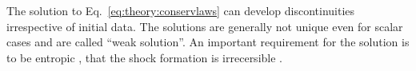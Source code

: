 The solution to Eq.~\eqref{eq:theory:conservlaws} can develop discontinuities
irrespective of initial data. The solutions are generally not 
unique even for scalar cases and are called ``weak solution''. %
An important requirement for the solution is to be entropic \ie, 
that the shock formation is irrecersible \citep{LeVeque:1992}.

